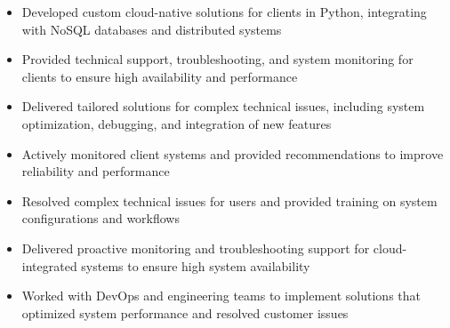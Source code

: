 \par\smallskip
\begin{minipage}{13.75cm}
  \begin{minipage}{6.5cm}
    \begin{itemize}
      \item Developed custom cloud-native solutions for clients in Python, integrating with NoSQL databases and distributed systems
      \item Provided technical support, troubleshooting, and system monitoring for clients to ensure high availability and performance
    \end{itemize}
  \end{minipage}
  \hfill
  \begin{minipage}{6.5cm}
    \begin{itemize}
      \item Delivered tailored solutions for complex technical issues, including system optimization, debugging, and integration of new features
      \item Actively monitored client systems and provided recommendations to improve reliability and performance
    \end{itemize}
  \end{minipage}
\end{minipage}
\par\smallskip
\divider

\par\smallskip
\begin{minipage}{13.75cm}
  \begin{minipage}{6.5cm}
    \begin{itemize}
      \item Resolved complex technical issues for users and provided training on system configurations and workflows
      \item Delivered proactive monitoring and troubleshooting support for cloud-integrated systems to ensure high system availability
    \end{itemize}
  \end{minipage}
  \hfill
  \begin{minipage}{6.5cm}
    \begin{itemize}
      \item Worked with DevOps and engineering teams to implement solutions that optimized system performance and resolved customer issues
    \end{itemize}
  \end{minipage}
\end{minipage}

